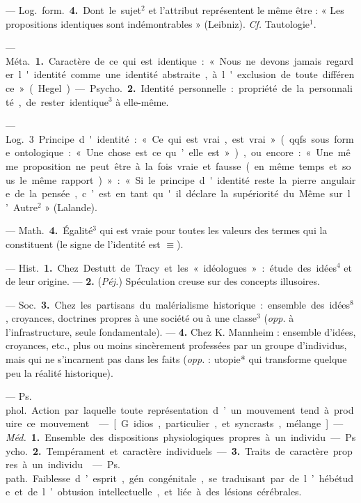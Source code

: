 \begin{itemize}[leftmargin=1cm, label=, itemsep=1pt]
— \si{Log.} \si{form.} {\bf 4.} Dont le sujet$^2$ et
l’attribut représentent le même être :
« Les propositions identiques sont
indémontrables » (Leibniz). {\it {\it Cf.}} Tautologie$^1$.

 — \si{Méta.} {\bf 1.} Caractère de ce
qui est identique : « Nous ne devons
jamais regarder l'identité comme
une identité abstraite, à l'exclusion
de toute différence » (Hegel).

— \si{Psycho.} {\bf 2.} Identité personnelle : propriété de la personnalité,
de rester identique$^3$ à elle-même.

— \si{Log.} 3 Principe d'identité :
« Ce qui est vrai, est vrai » (qqfs.
sous forme ontologique : « Une chose
est ce qu’elle est »), ou encore :
« Une même proposition ne peut être
à la fois vraie et fausse (en même
temps et sous le même rapport) » :
« Si le principe d'identité reste la
pierre angulaire de la pensée, c’est
en tant qu'il déclare la supériorité
du Même sur l’Autre$^2$ » (Lalande).

— \si{Math.} {\bf 4.} Égalité$^3$ qui est vraie
pour toutes les valeurs des termes
qui la constituent (le signe de l’identité est $\equiv$).

 — \si{Hist.} {\bf 1.} Chez Destutt de
Tracy et les « idéologues » : étude des
idées$^4$ et de leur origine. — {\bf 2.} ({\it Péj.})
Spéculation creuse sur des concepts
illusoires.

— \si{Soc.} {\bf 3.} Chez les partisans du
malérialisme historique : ensemble
des idées$^8$, croyances, doctrines
propres à une société ou à une
classe$^3$ ({\it opp.} à l'infrastructure, seule
fondamentale). — {\bf 4.} Chez K. Mannheim : ensemble d'idées, croyances, etc., plus ou moins sincèrement
professées par un groupe d’individus, mais qui ne s’incarnent pas
dans les faits ({\it opp.} : utopie* qui
transforme quelque peu la réalité
historique).

 — \si{Ps. phol.}
Action par laquelle toute représentation d’un mouvement tend à produire ce mouvement.

 — [G. idios, particulier,
et syncrasts, mélange] — \si{{\it Méd.}} {\bf 1.}
Ensemble des dispositions physiologiques propres à un individu. —
\si{Psycho.} {\bf 2.} Tempérament et caractère individuels. — {\bf 3.} Traits de
caractère propres à un individu.

 — \si{Ps. path.} Faiblesse d’esprit,
gén. congénitale, se traduisant par
de l’hébétude et de l’obtusion intellectuelle, et liée à des lésions cérébrales.


\end{itemize}
